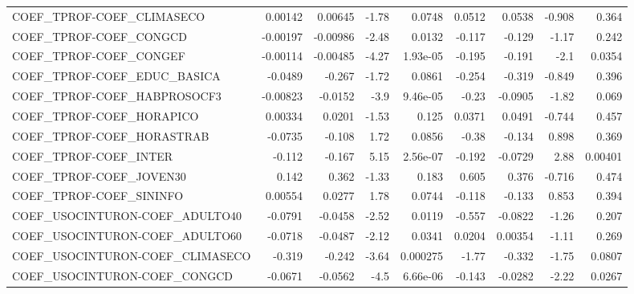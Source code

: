 \begin{tabular}{lrrrrrrrr}
COEF\_TPROF-COEF\_CLIMASECO             &     0.00142 &      0.00645 &   -1.78 &   0.0748 &     0.0512 &      0.0538 &       -0.908 &         0.364 \\
COEF\_TPROF-COEF\_CONGCD                &    -0.00197 &     -0.00986 &   -2.48 &   0.0132 &     -0.117 &      -0.129 &        -1.17 &         0.242 \\
COEF\_TPROF-COEF\_CONGEF                &    -0.00114 &     -0.00485 &   -4.27 & 1.93e-05 &     -0.195 &      -0.191 &         -2.1 &        0.0354 \\
COEF\_TPROF-COEF\_EDUC\_BASICA           &     -0.0489 &       -0.267 &   -1.72 &   0.0861 &     -0.254 &      -0.319 &       -0.849 &         0.396 \\
COEF\_TPROF-COEF\_HABPROSOCF3           &    -0.00823 &      -0.0152 &    -3.9 & 9.46e-05 &      -0.23 &     -0.0905 &        -1.82 &         0.069 \\
COEF\_TPROF-COEF\_HORAPICO              &     0.00334 &       0.0201 &   -1.53 &    0.125 &     0.0371 &      0.0491 &       -0.744 &         0.457 \\
COEF\_TPROF-COEF\_HORASTRAB             &     -0.0735 &       -0.108 &    1.72 &   0.0856 &      -0.38 &      -0.134 &        0.898 &         0.369 \\
COEF\_TPROF-COEF\_INTER                 &      -0.112 &       -0.167 &    5.15 & 2.56e-07 &     -0.192 &     -0.0729 &         2.88 &       0.00401 \\
COEF\_TPROF-COEF\_JOVEN30               &       0.142 &        0.362 &   -1.33 &    0.183 &      0.605 &       0.376 &       -0.716 &         0.474 \\
COEF\_TPROF-COEF\_SININFO               &     0.00554 &       0.0277 &    1.78 &   0.0744 &     -0.118 &      -0.133 &        0.853 &         0.394 \\
COEF\_USOCINTURON-COEF\_ADULTO40        &     -0.0791 &      -0.0458 &   -2.52 &   0.0119 &     -0.557 &     -0.0822 &        -1.26 &         0.207 \\
COEF\_USOCINTURON-COEF\_ADULTO60        &     -0.0718 &      -0.0487 &   -2.12 &   0.0341 &     0.0204 &     0.00354 &        -1.11 &         0.269 \\
COEF\_USOCINTURON-COEF\_CLIMASECO       &      -0.319 &       -0.242 &   -3.64 & 0.000275 &      -1.77 &      -0.332 &        -1.75 &        0.0807 \\
COEF\_USOCINTURON-COEF\_CONGCD          &     -0.0671 &      -0.0562 &    -4.5 & 6.66e-06 &     -0.143 &     -0.0282 &        -2.22 &        0.0267 \\

\end{tabular}
